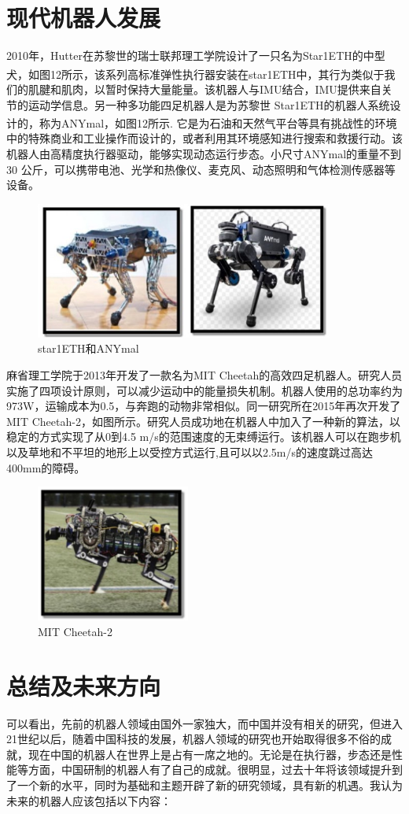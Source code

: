 \documentclass[12pt,a4paper]{ctexart}
\newcommand{\supercite}[1]{\textsuperscript{\cite{#1}}}
\begin{document}
{\section{现代机器人发展}
2010年，Hutter在苏黎世的瑞士联邦理工学院设计了一只名为Star1ETH的中型犬，如图12所示\supercite{29}，该系列高标准弹性执行器安装在star1ETH中，其行为类似于我们的肌腱和肌肉，以暂时保持大量能量。该机器人与IMU结合，IMU提供来自关节​​的运动学信息。另一种多功能四足机器人是为苏黎世 Star1ETH的机器人系统设计的，称为ANYmal，如图12所示\supercite{30}. 它是为石油和天然气平台等具有挑战性的环境中的特殊商业和工业操作而设计的，或者利用其环境感知进行搜索和救援行动。该机器人由高精度执行器驱动，能够实现动态运行步态。小尺寸ANYmal的重量不到 30 公斤，可以携带电池、光学和热像仪、麦克风、动态照明和气体检测传感器等设备。
\begin{figure}[H]
	\centering
	\includegraphics[height=4.5cm]{IMG_12.jpg}
	\caption{star1ETH和ANYmal}
\end{figure}

麻省理工学院于2013年开发了一款名为MIT Cheetah的高效四足机器人。研究人员实施了四项设计原则，可以减少运动中的能量损失机制。机器人使用的总功率约为973W，运输成本为0.5，与奔跑的动物非常相似。同一研究所在2015年再次开发了MIT Cheetah-2，如图所示。研究人员成功地在机器人中加入了一种新的算法，以稳定的方式实现了从0到4.5 m/s的范围速度的无束缚运行。该机器人可以在跑步机以及草地和不平坦的地形上以受控方式运行,且可以以2.5m/s的速度跳过高达400mm的障碍。
\begin{figure}[H]
	\centering
	\includegraphics[height=4.5cm]{IMG_09.jpg}
	\caption{MIT Cheetah-2}
\end{figure}
\section{总结及未来方向}
可以看出，先前的机器人领域由国外一家独大，而中国并没有相关的研究，但进入21世纪以后，随着中国科技的发展，机器人领域的研究也开始取得很多不俗的成就，现在中国的机器人在世界上是占有一席之地的。无论是在执行器，步态还是性能等方面，中国研制的机器人有了自己的成就。很明显，过去十年将该领域提升到了一个新的水平，同时为基础和主题开辟了新的研究领域，具有新的机遇。我认为未来的机器人应该包括以下内容：

}
\end{document}
